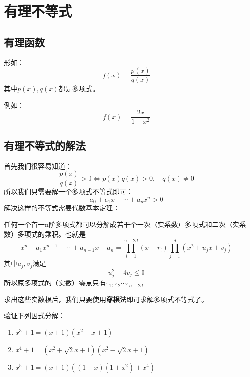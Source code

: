 \section{有理不等式}

\subsection{有理函数}
\begin{definition}[有理函数]
    形如：
    $$
        f(x) = \frac{p(x)}{q(x)}
    $$
    其中$p(x),q(x)$都是多项式。
\end{definition}
例如：
$$
    f(x) = \frac{2x}{1-x^2}
$$

\subsection{有理不等式的解法}

首先我们很容易知道：
$$
    \frac{p(x)}{q(x)} > 0 \iff p(x)q(x)>0, \quad q(x)\ne 0
$$
所以我们只需要解一个多项式不等式即可：
$$
    a_0 + a_1x+\cdots+a_nx^n > 0
$$
解决这样的不等式需要代数基本定理：

\begin{theorem}[代数基本定理]
    任何一个首一n阶多项式都可以分解成若干个一次（实系数）多项式和二次（实系数）多项式的乘积。也就是：
    $$
        x^n + a_1x^{n-1}+\cdots+a_{n-1}x+a_n = \prod_{i=1}^{n-2d} (x-r_i) \prod_{j=1}^d(x^2+u_jx+v_j)
    $$
    其中$u_j,v_j$满足
    $$
        u_j^2-4v_j\le 0
    $$
    所以原多项式的（实数）零点只有$r_1,r_2\cdots r_{n-2d}$
\end{theorem}

求出这些实数根后，我们只要使用\textbf{穿根法}即可求解多项式不等式了。
\begin{exercise}
    验证下列因式分解：
    \begin{enumerate}
        \item $x^3+1 = (x+1)(x^2-x+1)$
        \item $x^4+1 = (x^2+\sqrt{2}x+1)(x^2-\sqrt{2}x+1)$
        \item $x^5+1 = (x+1)((1-x)(1+x^2)+x^4)$
    \end{enumerate}
\end{exercise}